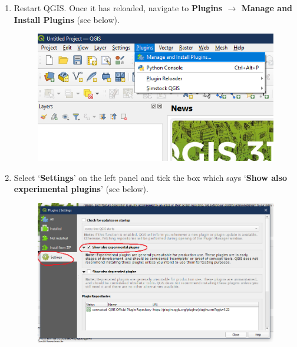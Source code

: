 \documentclass{article}
\begin{document}
\begin{enumerate}
    \item Restart QGIS. Once it has reloaded, navigate to \textbf{Plugins $\rightarrow$ Manage and Install Plugins} (see below).
    \begin{figure}[h!]
        \centering
        \includegraphics[width=12cm]{manage-plugins.png}
        \label{fig:manage_plugins}
    \end{figure}
    \clearpage
    
    \item Select `\textbf{Settings}' on the left panel and tick the box which says `\textbf{Show also experimental plugins}' (see below).
    \begin{figure}[h!]
        \centering
        \includegraphics[width=14cm]{show_experimental.png}
        \label{fig:show_exp}
    \end{figure}
    

\end{enumerate}
\end{document}
